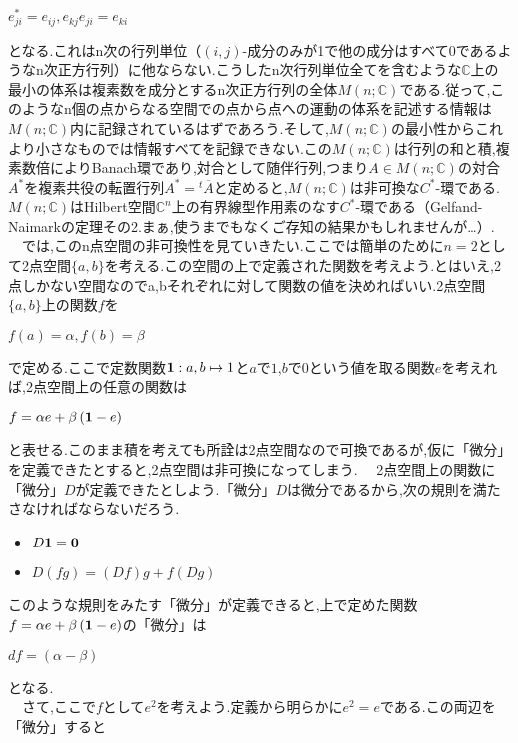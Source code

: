 \begin{center}
$e_{ji}^*=e_{ij},　e_{kj}e_{ji}=e_{ki}$
\end{center}
となる.これはn次の行列単位（$\left(i,j\right)$-成分のみが1で他の成分はすべて0であるようなn次正方行列）に他ならない.こうしたn次行列単位全てを含むような$\mathbb{C}$上の最小の体系は複素数を成分とするn次正方行列の全体$M\left(n;\mathbb{C}\right)$である.従って,このようなn個の点からなる空間での点から点への運動の体系を記述する情報は$M\left(n;\mathbb{C}\right)$内に記録されているはずであろう.そして,$M\left(n;\mathbb{C}\right)$の最小性からこれより小さなものでは情報すべてを記録できない.この$M\left(n;\mathbb{C}\right)$は行列の和と積,複素数倍によりBanach環であり,対合として随伴行列,つまり$A\in M\left(n;\mathbb{C}\right)$の対合$A^*$を複素共役の転置行列$A^*={}^{t}\overline{A}$と定めると,$M\left(n;\mathbb{C}\right)$は非可換な$C^*$-環である.$M\left(n;\mathbb{C}\right)$はHilbert空間$\mathbb{C}^n$上の有界線型作用素のなす$C^*$-環である（Gelfand-Naimarkの定理その2.まぁ,使うまでもなくご存知の結果かもしれませんが…）.
　では,このn点空間の非可換性を見ていきたい.ここでは簡単のために$n=2$として2点空間$\{a,b\}$を考える.この空間の上で定義された関数を考えよう.とはいえ,2点しかない空間なのでa,bそれぞれに対して関数の値を決めればいい.2点空間$\{a,b\}$上の関数$f$を
\begin{center}
$f\left(a\right)=\alpha,　f\left(b\right)=\beta$
\end{center}
で定める.ここで定数関数${\bf 1}:a,b\mapsto 1$と$a$で$1$,$b$で$0$という値を取る関数$e$を考えれば,2点空間上の任意の関数は
\begin{center}
$f=\alpha e+\beta \left({\bf 1}-e\right)$
\end{center}
と表せる.このまま積を考えても所詮は2点空間なので可換であるが,仮に「微分」を定義できたとすると,2点空間は非可換になってしまう.
　2点空間上の関数に「微分」$D$が定義できたとしよう.「微分」$D$は微分であるから,次の規則を満たさなければならないだろう.
\begin{itemize}
\item$D{\bf 1}={\bf 0}$
\item$D\left(fg\right)=\left(Df\right)g+f\left(Dg\right)$
\end{itemize}
このような規則をみたす「微分」が定義できると,上で定めた関数$f=\alpha e+\beta \left({\bf 1}-e\right)$の「微分」は
\begin{center}
$df=\left(\alpha-\beta\right)$
\end{center}
となる.\\
　さて,ここで$f$として$e^2$を考えよう.定義から明らかに$e^2=e$である.この両辺を「微分」すると
